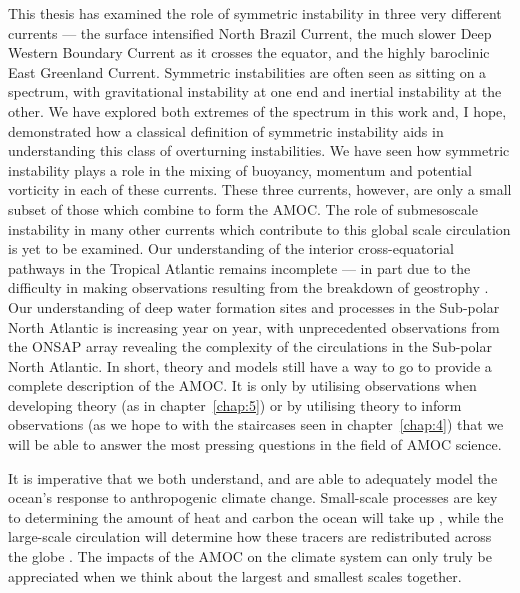 This thesis has examined the role of symmetric instability in three very different currents --- the surface intensified North Brazil Current, the much slower Deep Western Boundary Current as it crosses the equator, and the highly baroclinic East Greenland Current. Symmetric instabilities are often seen as sitting on a spectrum, with gravitational instability at one end and inertial instability at the other. We have explored both extremes of the spectrum in this work and, I hope, demonstrated how a classical definition of symmetric instability aids in understanding this class of overturning instabilities. We have seen how symmetric instability plays a role in the mixing of buoyancy, momentum and potential vorticity in each of these currents. These three currents, however, are only a small subset of those which combine to form the AMOC. The role of submesoscale instability in many other currents which contribute to this global scale circulation is yet to be examined. Our understanding of the interior cross-equatorial pathways in the Tropical Atlantic remains incomplete --- in part due to the difficulty in making observations resulting from the breakdown of geostrophy \citep[e.g.][]{Vianna2003}. Our understanding of deep water formation sites and processes in the Sub-polar North Atlantic is increasing year on year, with unprecedented observations from the ONSAP array revealing the complexity of the circulations in the Sub-polar North Atlantic. In short, theory and models still have a way to go to provide a complete description of the AMOC. It is only by utilising observations when developing theory (as in chapter~\ref{chap:5}) or by utilising theory to inform observations (as we hope to with the staircases seen in chapter~\ref{chap:4}) that we will be able to answer the most pressing questions in the field of AMOC science.

It is imperative that we both understand, and are able to adequately model the ocean's response to anthropogenic climate change. Small-scale processes are key to determining the amount of heat and carbon the ocean will take up \citep{DeLavergne2022}, while the large-scale circulation will determine how these tracers are redistributed across the globe \citep{Buckley2015}. The impacts of the AMOC on the climate system can only truly be appreciated when we think about the largest and smallest scales together.
